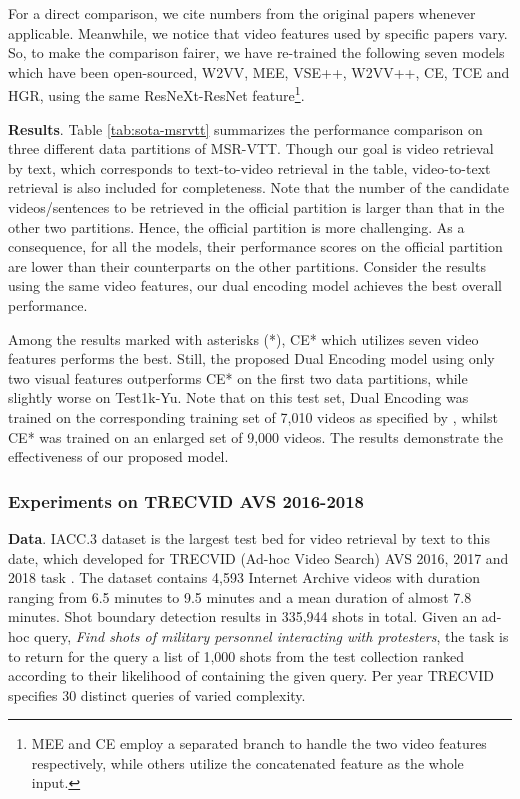 For a direct comparison, we cite numbers from the original papers whenever applicable. Meanwhile, we notice that video features used by specific papers vary. So, to make the comparison fairer, we have re-trained the following seven models which have been open-sourced, \ie W2VV, MEE, VSE++, W2VV++, CE, TCE and HGR, using the same ResNeXt-ResNet feature\footnote{MEE and CE employ a separated branch to handle the two video features respectively, while others utilize the concatenated feature as the whole input. }.



\textbf{Results}.
Table \ref{tab:sota-msrvtt} summarizes the performance comparison on three different data partitions of MSR-VTT. Though our goal is video retrieval by text, which corresponds to text-to-video retrieval in the table, video-to-text retrieval is also included for completeness.
Note that the number of the candidate videos/sentences to be retrieved in the official partition is larger than that in the other two partitions. Hence, the official partition is more challenging. As a consequence, for all the models, their performance scores on the official partition are lower than their counterparts on the other partitions. 
Consider the results using the same video features, our dual encoding model achieves the best overall performance. 


Among the results marked with asterisks (*), CE* which utilizes seven video features performs the best.
Still, the proposed Dual Encoding model using only two visual features outperforms CE* on the first two data partitions, while slightly worse on Test1k-Yu. Note that on this test set, Dual Encoding was trained on the corresponding training set of 7,010 videos as specified by \cite{yu2018joint}, whilst CE* was trained on an enlarged set of 9,000 videos. The results demonstrate the effectiveness of our proposed model.


\subsubsection{Experiments on TRECVID AVS 2016-2018}

\textbf{Data}. 
IACC.3 dataset is the largest test bed for video retrieval by text to this date, which developed for TRECVID (Ad-hoc Video Search) AVS 2016, 2017 and 2018 task \cite{AwadTRECVID16,AwadTRECVID17,AwadTRECVID18}. 
The dataset contains 4,593 Internet Archive videos with duration ranging from 6.5 minutes to 9.5 minutes and a mean duration of almost 7.8 minutes. Shot boundary detection results in 335,944 shots in total. 
Given an ad-hoc query, \eg \emph{Find shots of military personnel interacting with protesters}, the task is to return for the query a list of 1,000 shots from the test collection ranked according to their likelihood of containing the given query. Per year TRECVID specifies 30 distinct queries of varied complexity.

